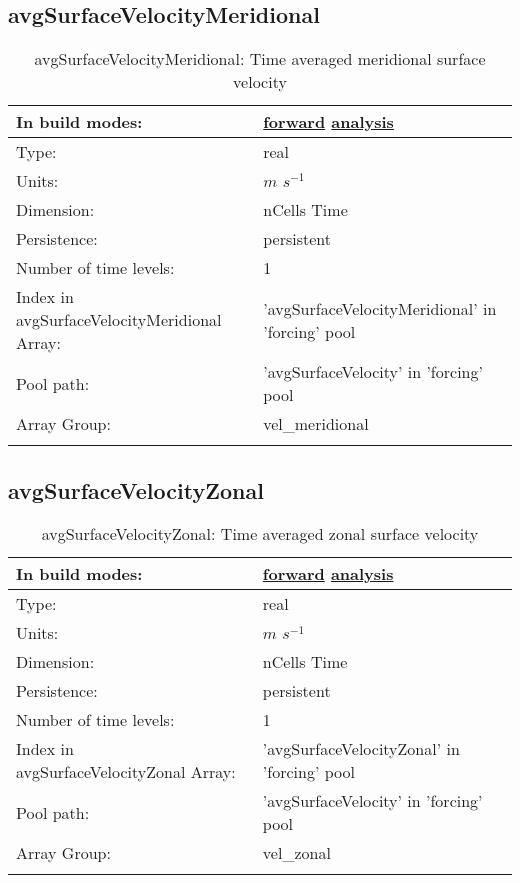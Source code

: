 \subsection[avgSurfaceVelocityMeridional]{avgSurfaceVelocityMeridional}
\label{subsec:var_sec_forcing_avgSurfaceVelocityMeridional}
\begin{center}
\begin{longtable}{| p{2.0in} | p{4.0in} |}
        \hline 
        In build modes: & \hyperref[subsec:forward_var_tab_forcing]{forward} \hyperref[subsec:analysis_var_tab_forcing]{analysis} \\
        \hline 
        Type: & real \\
        \hline 
        Units: & $m$ $s^{-1}$ \\
        \hline 
        Dimension: & nCells Time \\
        \hline 
        Persistence: & persistent \\
        \hline 
        Number of time levels: & 1 \\
        \hline 
		 Index in avgSurfaceVelocityMeridional Array: & 'avgSurfaceVelocityMeridional' in 'forcing' pool \\
		 \hline 
            Pool path: & 'avgSurfaceVelocity' in 'forcing' pool
 \\
		 \hline 
		 Array Group: & vel\_meridional \\
		 \hline 
    \caption{avgSurfaceVelocityMeridional: Time averaged meridional surface velocity}
\end{longtable}
\end{center}
\subsection[avgSurfaceVelocityZonal]{avgSurfaceVelocityZonal}
\label{subsec:var_sec_forcing_avgSurfaceVelocityZonal}
\begin{center}
\begin{longtable}{| p{2.0in} | p{4.0in} |}
        \hline 
        In build modes: & \hyperref[subsec:forward_var_tab_forcing]{forward} \hyperref[subsec:analysis_var_tab_forcing]{analysis} \\
        \hline 
        Type: & real \\
        \hline 
        Units: & $m$ $s^{-1}$ \\
        \hline 
        Dimension: & nCells Time \\
        \hline 
        Persistence: & persistent \\
        \hline 
        Number of time levels: & 1 \\
        \hline 
		 Index in avgSurfaceVelocityZonal Array: & 'avgSurfaceVelocityZonal' in 'forcing' pool \\
		 \hline 
            Pool path: & 'avgSurfaceVelocity' in 'forcing' pool
 \\
		 \hline 
		 Array Group: & vel\_zonal \\
		 \hline 
    \caption{avgSurfaceVelocityZonal: Time averaged zonal surface velocity}
\end{longtable}
\end{center}
